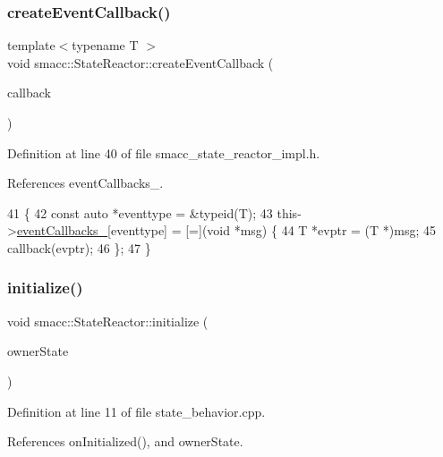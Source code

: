 \subsubsection{\texorpdfstring{create\+Event\+Callback()}{createEventCallback()}\hspace{0.1cm}{\footnotesize\ttfamily [2/2]}}
{\footnotesize\ttfamily template$<$typename T $>$ \\
void smacc\+::\+State\+Reactor\+::create\+Event\+Callback (\begin{DoxyParamCaption}\item[{std\+::function$<$ void(T $\ast$)$>$}]{callback }\end{DoxyParamCaption})}



Definition at line 40 of file smacc\+\_\+state\+\_\+reactor\+\_\+impl.\+h.



References event\+Callbacks\+\_\+.


\begin{DoxyCode}
41 \{
42     \textcolor{keyword}{const} \textcolor{keyword}{auto} *eventtype = &\textcolor{keyword}{typeid}(T);
43     this->\hyperlink{classsmacc_1_1StateReactor_a63cce05c412f3699cc1b15af9aeaf8af}{eventCallbacks\_}[eventtype] = [=](\textcolor{keywordtype}{void} *msg) \{
44         T *evptr = (T *)msg;
45         callback(evptr);
46     \};
47 \}
\end{DoxyCode}
\mbox{\label{classsmacc_1_1StateReactor_a5c1d734e3a495fa0f2b01229a3dbac3f}} 
\subsubsection{\texorpdfstring{initialize()}{initialize()}}
{\footnotesize\ttfamily void smacc\+::\+State\+Reactor\+::initialize (\begin{DoxyParamCaption}\item[{\hyperlink{classsmacc_1_1ISmaccState}{smacc\+::\+I\+Smacc\+State} $\ast$}]{owner\+State }\end{DoxyParamCaption})}



Definition at line 11 of file state\+\_\+behavior.\+cpp.



References on\+Initialized(), and owner\+State.


